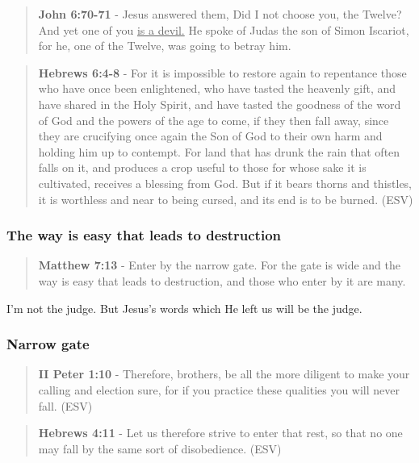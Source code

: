 \documentclass[11pt]{article}
\begin{document}
\begin{quote}
\textbf{John 6:70-71} - Jesus answered them, Did I not choose you, the Twelve? And yet one of you \uline{is a devil.} He spoke of Judas the son of Simon Iscariot, for he, one of the Twelve, was going to betray him.
\end{quote}

\begin{quote}
\textbf{Hebrews 6:4-8} - For it is impossible to restore again to repentance those who have once been enlightened, who have tasted the heavenly gift, and have shared in the Holy Spirit, and have tasted the goodness of the word of God and the powers of the age to come, if they then fall away, since they are crucifying once again the Son of God to their own harm and holding him up to contempt. For land that has drunk the rain that often falls on it, and produces a crop useful to those for whose sake it is cultivated, receives a blessing from God. But if it bears thorns and thistles, it is worthless and near to being cursed, and its end is to be burned. (ESV)
\end{quote}

\subsubsection{The way is easy that leads to destruction}
\label{sec:orgfc7dadc}
\begin{quote}
\textbf{Matthew 7:13} - Enter by the narrow gate. For the gate is wide and the way is easy that leads to destruction, and those who enter by it are many.
\end{quote}

I'm not the judge. But Jesus's words which He left us will be the judge.

\subsubsection{Narrow gate}
\label{sec:orgf935951}
\begin{quote}
\textbf{II Peter 1:10} - Therefore, brothers, be all the more diligent to make your calling and election sure, for if you practice these qualities you will never fall. (ESV)
\end{quote}

\begin{quote}
\textbf{Hebrews 4:11} - Let us therefore strive to enter that rest, so that no one may fall by the same sort of disobedience. (ESV)
\end{quote}
\end{document}
